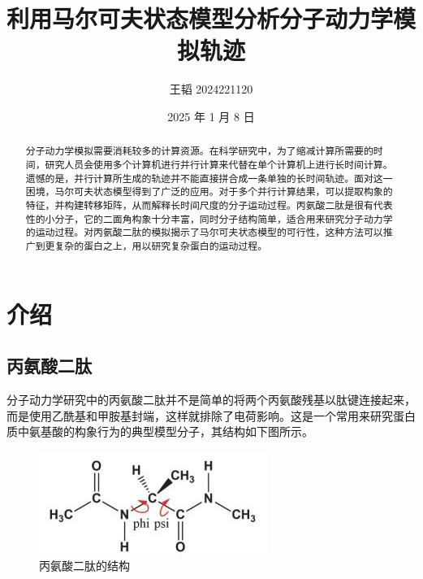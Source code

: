 \documentclass[a4paper]{article}
\title{利用马尔可夫状态模型分析分子动力学模拟轨迹}                   %
\author{王韬 2024221120}
\date{2025 年 1 月 8 日}
\begin{document}
	
\begin{CJK}{UTF8}{gbsn}
\maketitle

\begin{center}
\tableofcontents
\end{center}

\newpage

 \begin{abstract}

分子动力学模拟需要消耗较多的计算资源。在科学研究中，为了缩减计算所需要的时间，研究人员会使用多个计算机进行并行计算来代替在单个计算机上进行长时间计算。遗憾的是，并行计算所生成的轨迹并不能直接拼合成一条单独的长时间轨迹。面对这一困境，马尔可夫状态模型得到了广泛的应用。对于多个并行计算结果，可以提取构象的特征，并构建转移矩阵，从而解释长时间尺度的分子运动过程。丙氨酸二肽是很有代表性的小分子，它的二面角构象十分丰富，同时分子结构简单，适合用来研究分子动力学的运动过程。对丙氨酸二肽的模拟揭示了马尔可夫状态模型的可行性，这种方法可以推广到更复杂的蛋白之上，用以研究复杂蛋白的运动过程。

 \end{abstract}

\newpage


\section{介绍}
	\subsection{丙氨酸二肽}

	分子动力学研究中的丙氨酸二肽并不是简单的将两个丙氨酸残基以肽键连接起来，而是使用乙酰基和甲胺基封端，这样就排除了电荷影响\cite{pande2010everything}。这是一个常用来研究蛋白质中氨基酸的构象行为的典型模型分子，其结构如下图所示。

\begin{figure}[H]
\centering
\includegraphics[scale=0.35]{ala_di.jpg}
\caption{丙氨酸二肽的结构}
\end{figure}


\end{CJK}
\end{document}
